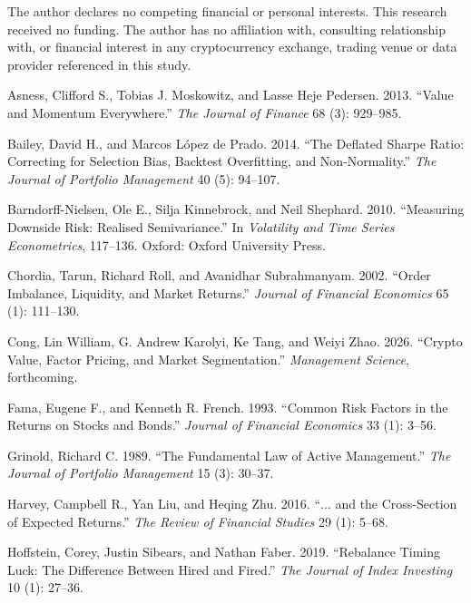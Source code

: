 \documentclass[12pt]{article}
\makeatletter
\renewcommand{\section}[1]{\par\vspace{16pt}%
  \noindent{\bfseries\MakeUppercase{#1}}\par\nobreak\vspace{4pt}%
  \@afterindenttrue\@afterheading}
\makeatother
\begin{document}
The author declares no competing financial or personal interests. This research
received no funding. The author has no affiliation with, consulting relationship
with, or financial interest in any cryptocurrency exchange, trading venue or data
provider referenced in this study.

\section{References}

\noindent\hangindent=0.5in Asness, Clifford S., Tobias J. Moskowitz, and
Lasse Heje Pedersen. 2013. ``Value and Momentum Everywhere.'' \emph{The Journal of
Finance} 68 (3): 929--985.

\noindent\hangindent=0.5in Bailey, David H., and Marcos L\'opez de Prado. 2014.
``The Deflated Sharpe Ratio: Correcting for Selection Bias, Backtest Overfitting,
and Non-Normality.'' \emph{The Journal of Portfolio Management} 40 (5): 94--107.

\noindent\hangindent=0.5in Barndorff-Nielsen, Ole E., Silja Kinnebrock, and Neil
Shephard. 2010. ``Measuring Downside Risk: Realised Semivariance.'' In
\emph{Volatility and Time Series Econometrics}, 117--136. Oxford: Oxford
University Press.

\noindent\hangindent=0.5in Chordia, Tarun, Richard Roll, and Avanidhar
Subrahmanyam. 2002. ``Order Imbalance, Liquidity, and Market Returns.''
\emph{Journal of Financial Economics} 65 (1): 111--130.

\noindent\hangindent=0.5in Cong, Lin William, G. Andrew Karolyi, Ke Tang, and
Weiyi Zhao. 2026. ``Crypto Value, Factor Pricing, and Market Segmentation.''
\emph{Management Science}, forthcoming.

\noindent\hangindent=0.5in Fama, Eugene F., and Kenneth R. French. 1993. ``Common
Risk Factors in the Returns on Stocks and Bonds.'' \emph{Journal of Financial
Economics} 33 (1): 3--56.

\noindent\hangindent=0.5in Grinold, Richard C. 1989. ``The Fundamental Law of
Active Management.'' \emph{The Journal of Portfolio Management} 15 (3): 30--37.

\noindent\hangindent=0.5in Harvey, Campbell R., Yan Liu, and Heqing Zhu. 2016.
``$\ldots$ and the Cross-Section of Expected Returns.'' \emph{The Review of
Financial Studies} 29 (1): 5--68.

\noindent\hangindent=0.5in Hoffstein, Corey, Justin Sibears, and Nathan Faber.
2019. ``Rebalance Timing Luck: The Difference Between Hired and Fired.''
\emph{The Journal of Index Investing} 10 (1): 27--36.
\end{document}
